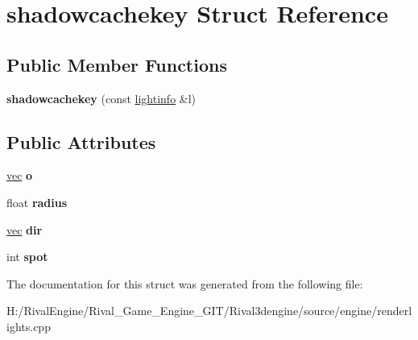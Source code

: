 \hypertarget{structshadowcachekey}{}\section{shadowcachekey Struct Reference}
\label{structshadowcachekey}
\subsection*{Public Member Functions}
\begin{DoxyCompactItemize}
\item 
\mbox{\label{structshadowcachekey_a57a91889d412264acec7ddcf4f096226}} 
{\bfseries shadowcachekey} (const \hyperlink{structlightinfo}{lightinfo} \&l)
\end{DoxyCompactItemize}
\subsection*{Public Attributes}
\begin{DoxyCompactItemize}
\item 
\mbox{\label{structshadowcachekey_a16a8284380bc681da123913b61fffb64}} 
\hyperlink{structvec}{vec} {\bfseries o}
\item 
\mbox{\label{structshadowcachekey_a8d8697d53b294caef1045c5af7a3e88a}} 
float {\bfseries radius}
\item 
\mbox{\label{structshadowcachekey_a33cff71cfc6048283ded167e577a3ca8}} 
\hyperlink{structvec}{vec} {\bfseries dir}
\item 
\mbox{\label{structshadowcachekey_a35e9bd43ddcf48b0dfe245a485e1e34e}} 
int {\bfseries spot}
\end{DoxyCompactItemize}


The documentation for this struct was generated from the following file\+:\begin{DoxyCompactItemize}
\item 
H\+:/\+Rival\+Engine/\+Rival\+\_\+\+Game\+\_\+\+Engine\+\_\+\+G\+I\+T/\+Rival3dengine/source/engine/renderlights.\+cpp\end{DoxyCompactItemize}
